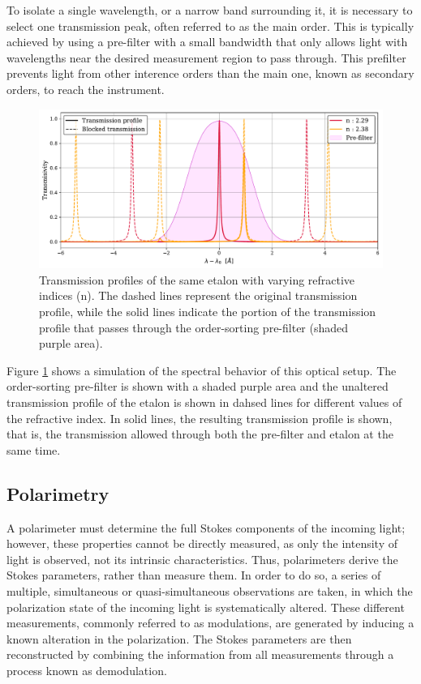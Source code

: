 To isolate a single wavelength, or a narrow band surrounding it, it is necessary to select one transmission peak, often referred to as the main order. This is typically achieved by using a pre-filter with a small bandwidth that only allows light with wavelengths near the desired measurement region to pass through. This prefilter prevents light from other interence orders than the main one, known as secondary orders, to reach the instrument.   

\begin{figure}
  \centering
  \includegraphics[width = \textwidth]{figures/Introduction_to_spectropolarimeters/Etalon_and_prefilter_example.pdf}
  \caption{Transmission profiles of the same etalon with varying refractive indices (n). The dashed lines represent the original transmission profile, while the solid lines indicate the portion of the transmission profile that passes through the order-sorting pre-filter (shaded purple area).} 
  \label{fig_ch2: etalon_example}
\end{figure}

Figure \ref{fig_ch2: etalon_example} shows a simulation of the spectral behavior of this optical setup. The order-sorting pre-filter is shown with a shaded purple area and the unaltered transmission profile of the etalon is shown in dahsed lines for different values of the refractive index. In solid lines, the resulting transmission profile is shown, that is, the transmission allowed through both the pre-filter and etalon at the same time. 

\subsection{Polarimetry}

A polarimeter must determine the full Stokes components of the incoming light; however, these properties cannot be directly measured, as only the intensity of light is observed, not its intrinsic characteristics. Thus, polarimeters derive the Stokes parameters, rather than measure them. In order to do so, a series of multiple, simultaneous or quasi-simultaneous observations are taken, in which the polarization state of the incoming light is systematically altered. These different measurements, commonly referred to as modulations, are generated by inducing a known alteration in the polarization. The Stokes parameters are then reconstructed by combining the information from all measurements through a process known as demodulation.

